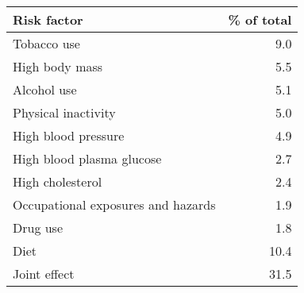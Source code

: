 \bgroup
\def\arraystretch{1.2}
\begin{tabular}{lr}
\toprule
\textbf{Risk factor} & \textbf{\% of total} \\ 
\midrule
Tobacco use & 9.0 \\
High body mass & 5.5 \\
Alcohol use & 5.1 \\
Physical inactivity & 5.0 \\
High blood pressure & 4.9 \\
High blood plasma glucose & 2.7 \\
High cholesterol & 2.4 \\
Occupational exposures and hazards & 1.9 \\
Drug use & 1.8 \\
Diet & 10.4 \\
Joint effect & 31.5 \\
\bottomrule
\end{tabular}
\egroup